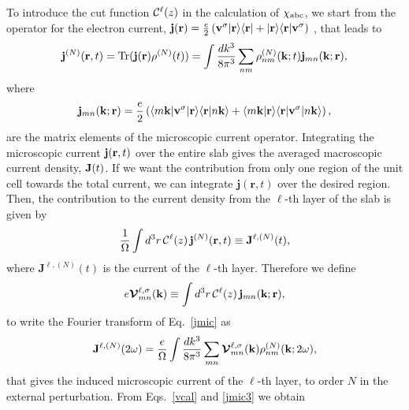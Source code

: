 \documentclass[floatfix,prb,aps,superscriptaddress,11pt,preprint,letterpaper]{revtex4}
\begin{document}
To introduce the
 cut function ${\mathbf{\cal C}}^\ell(z)$ in
the calculation of $\chi_{\mathrm{a}\mathrm{b}\mathrm{c}}$, we start from 
the
operator for the electron current,
$\mathbf{j}(\mathbf{r})=\frac{e}{2}\left(\mathbf{v}^\sigma| \mathbf{r} \rangle\langle \mathbf{r} |
+| \mathbf{r} \rangle\langle \mathbf{r} |\mathbf{v}^\sigma\right)
$
, 
that leads to
\begin{align}\label{jmic}
\mathbf{j}^{(N)}(\mathbf{r},t)=\mathrm{Tr}(\mathbf{j}(\mathbf{r})\rho^{(N)}(t))
=
\int \frac{dk^3}{8\pi^3}
\sum_{nm}
\rho^{(N)}_{nm}(\mathbf{k};t)\mathbf{j}_{mn}(\mathbf{k};\mathbf{r})
,
\end{align}
where 
\begin{equation}\label{jmic3}
\mathbf{j}_{mn}(\mathbf{k};\mathbf{r})=
\frac{e}{2}
\left(
\langle m\mathbf{k} |\mathbf{v}^\sigma| \mathbf{r} \rangle\langle {\mathbf{r}} | {n\mathbf{k}} \rangle
+
\langle {m\mathbf{k}} | {\mathbf{r}} \rangle\langle \mathbf{r} |\mathbf{v}^\sigma| n\mathbf{k} \rangle
\right),
\end{equation}
are the matrix elements of the microscopic current operator.
Integrating the microscopic current $\mathbf{j}(\mathbf{r},t)$ over
the entire slab gives the averaged macroscopic current density, $\mathbf{J}(t)$. 
If we want the contribution from only one region of the unit cell 
towards the total current, we can integrate $\mathbf{j}({\mathbf r},t)$ 
over the desired region. Then, the contribution to the current density from the
$\ell$-th layer of the slab is given by
\begin{equation}\label{jsz}
\frac{1}{\Omega}\int d^3r\, {\mathbf{\cal C}}^\ell(z)\, \mathbf{j}^{(N)}(\mathbf{r},t)
 \equiv \mathbf{J}^{\ell,(N)}(t),
\end{equation}
where $\mathbf{J}^{\ell,(N)}(t)$ is the current of the
$\ell$-th layer.
Therefore we define
\begin{equation}\label{vcal}
e{\boldsymbol{\mathcal{V}}}^{\ell,\sigma}_{mn}(\mathbf{k})
\equiv
\int d^3r\, {\mathbf{\cal C}}^\ell(z)\,\mathbf{j}_{mn}({\mathbf{k}};\mathbf{r}),
\end{equation}
to write the Fourier transform of Eq.~\eqref{jmic} as
\begin{equation}\label{jmac2}
\mathbf{J}^{\ell,(N)}(2\omega)=\frac{e}{\Omega}
\int \frac{dk^3}{8\pi^3}
\sum_{mn}
\boldsymbol{\mathcal{\cal V}}^{\ell,\sigma}_{mn}(\mathbf{k}) 
\rho^{(N)}_{nm}(\mathbf{k};2\omega) 
, 
\end{equation}
that gives the induced microscopic current of the $\ell$-th layer, to order $N$ 
in the external perturbation. 
From
Eqs.~\eqref{vcal} and \eqref{jmic3} we obtain
\end{document}
